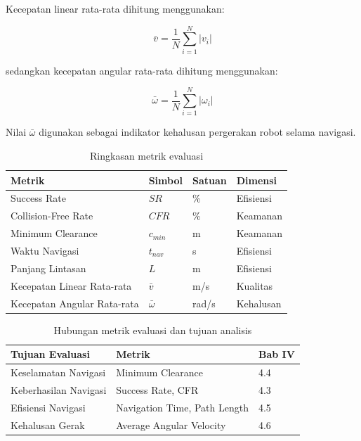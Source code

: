 Kecepatan linear rata-rata dihitung menggunakan:

\begin{equation}
\bar{v}
=
\frac{1}{N}
\sum_{i=1}^{N}
|v_i|
\label{eq:avg_linear}
\end{equation}

sedangkan kecepatan angular rata-rata dihitung menggunakan:

\begin{equation}
\bar{\omega}
=
\frac{1}{N}
\sum_{i=1}^{N}
|\omega_i|
\label{eq:avg_angular}
\end{equation}

Nilai $\bar{\omega}$ digunakan sebagai indikator kehalusan pergerakan robot selama navigasi.

\begin{table}[H]
\centering
\caption{Ringkasan metrik evaluasi}
\label{tab:metrik}
\begin{tabular}{llll}
\toprule
\textbf{Metrik} &
\textbf{Simbol} &
\textbf{Satuan} &
\textbf{Dimensi} \\
\midrule
Success Rate & $SR$ & \% & Efisiensi \\
Collision-Free Rate & $CFR$ & \% & Keamanan \\
Minimum Clearance & $c_{min}$ & m & Keamanan \\
Waktu Navigasi & $t_{nav}$ & s & Efisiensi \\
Panjang Lintasan & $L$ & m & Efisiensi \\
Kecepatan Linear Rata-rata & $\bar{v}$ & m/s & Kualitas \\
Kecepatan Angular Rata-rata & $\bar{\omega}$ & rad/s & Kehalusan \\
\bottomrule
\end{tabular}
\end{table}

\begin{table}[H]
\centering
\caption{Hubungan metrik evaluasi dan tujuan analisis}
\label{tab:metric_mapping}
\begin{tabular}{lll}
\toprule
\textbf{Tujuan Evaluasi} &
\textbf{Metrik} &
\textbf{Bab IV} \\
\midrule
Keselamatan Navigasi &
Minimum Clearance &
4.4 \\
Keberhasilan Navigasi &
Success Rate, CFR &
4.3 \\
Efisiensi Navigasi &
Navigation Time, Path Length &
4.5 \\
Kehalusan Gerak &
Average Angular Velocity &
4.6 \\
\bottomrule
\end{tabular}
\end{table}

